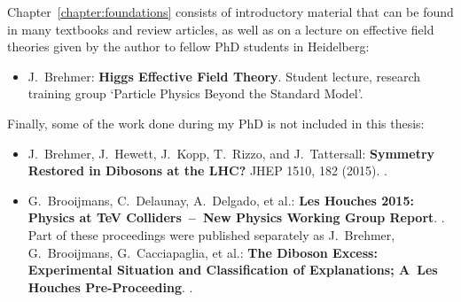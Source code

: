 Chapter~\ref{chapter:foundations} consists of introductory material
that can be found in many textbooks and review articles, as well as on
a lecture on effective field theories given by the author to fellow
PhD students in Heidelberg:
%
\begin{itemize}
  \item[\cite{Brehmer:EFTlecture}]  J.~Brehmer:\newline
	\textbf{Higgs Effective Field Theory}.\newline
        Student lecture, research training group `Particle Physics Beyond the Standard Model'.
\end{itemize}

Finally, some of the work done during my PhD is not included in this thesis:
%
\begin{itemize}
  \item[\cite{Brehmer:2015cia}] J.~Brehmer, J.~Hewett, J.~Kopp, T.~Rizzo, and J.~Tattersall:\newline
	\textbf{Symmetry Restored in Dibosons at the LHC?} \newline
	JHEP 1510, 182 (2015). .
  \item[\cite{Brehmer:2015dan,Brooijmans:2016vro}] G.~Brooijmans, C.~Delaunay, A.~Delgado, et al.:\newline
         \textbf{Les Houches 2015: Physics at TeV Colliders~--~New Physics Working Group Report}.\newline
        .\newline
         Part of these proceedings were published separately as\newline
         J.~Brehmer, G.~Brooijmans,  G.~Cacciapaglia, et al.:\newline
	\textbf{The Diboson Excess: Experimental Situation and Classification of Explanations; A~Les Houches Pre-Proceeding}.\newline
	.
\end{itemize}
